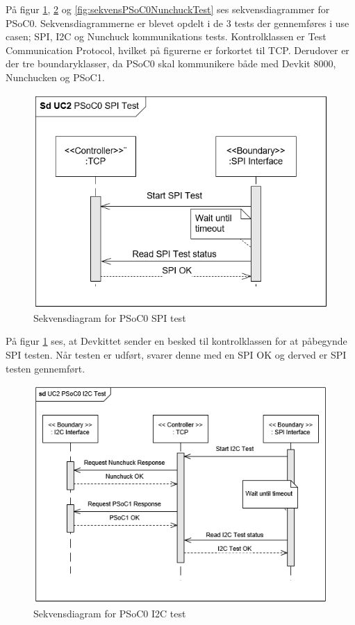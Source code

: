 På figur \ref{fig:sekvensPSoC0SPITest}, \ref{fig:sekvensPSoC0I2CTest} og \ref{fig:sekvensPSoC0NunchuckTest} ses sekvensdiagrammer for PSoC0. Sekvensdiagrammerne er blevet opdelt i de 3 tests der gennemføres i use casen; SPI, I2C og Nunchuck kommunikations tests. Kontrolklassen er Test Communication Protocol, hvilket på figurerne er forkortet til TCP. Derudover er der tre boundaryklasser, da PSoC0 skal kommunikere både med Devkit 8000, Nunchucken og PSoC1.

\begin{figure}[H]
	\centering
	\includegraphics[width=.8\textwidth] {Systemarkitektur/images/SDPSoC0SPITest}
	\caption{Sekvensdiagram for PSoC0 SPI test}
	\label{fig:sekvensPSoC0SPITest}
\end{figure}

På figur \ref{fig:sekvensPSoC0SPITest} ses, at Devkittet sender en besked til kontrolklassen for at påbegynde SPI testen. Når testen er udført, svarer denne med en SPI OK og derved er SPI testen gennemført.

\begin{figure}[H]
	\centering
	\includegraphics[width=\textwidth] {Systemarkitektur/images/SDPSoC0I2CTest}
	\caption{Sekvensdiagram for PSoC0 I2C test}
	\label{fig:sekvensPSoC0I2CTest}
\end{figure}

